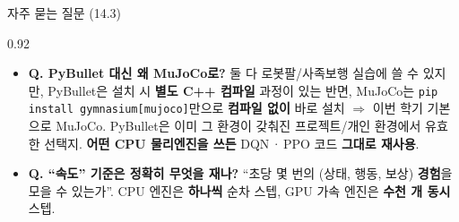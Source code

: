 \begin{frame}{자주 묻는 질문 (14.3)}
\begin{center}\begin{varwidth}{0.92\textwidth}
  \small
  \begin{itemize}
    \item \textbf{Q. PyBullet 대신 왜 MuJoCo로?}
      둘 다 로봇팔/사족보행 실습에 쓸 수 있지만, PyBullet은
      설치 시 \textbf{별도 C++ 컴파일} 과정이 있는 반면,
      MuJoCo는 \texttt{pip install gymnasium[mujoco]}만으로
      \textbf{컴파일 없이} 바로 설치 $\Rightarrow$ 이번 학기
      기본으로 MuJoCo. PyBullet은 이미 그 환경이 갖춰진
      프로젝트/개인 환경에서 유효한 선택지. \textbf{어떤 CPU
      물리엔진을 쓰든} DQN\,·\,PPO 코드 \textbf{그대로 재사용}.
    \item \textbf{Q. ``속도'' 기준은 정확히 무엇을 재나?}
      ``초당 몇 번의 (상태, 행동, 보상) \textbf{경험}을 모을 수
      있는가''. CPU 엔진은 \textbf{하나씩} 순차 스텝, GPU 가속
      엔진은 \textbf{수천 개 동시} 스텝.
  \end{itemize}
\end{varwidth}\end{center}
\end{frame}
